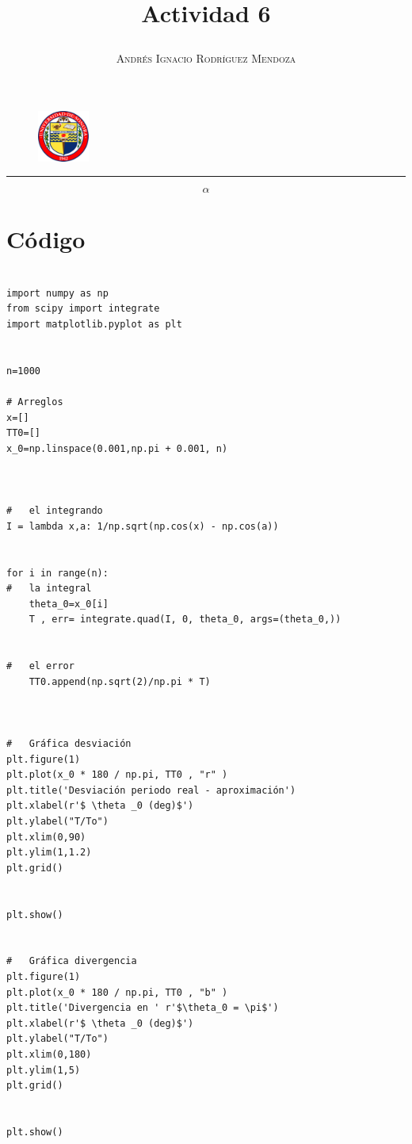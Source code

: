 \documentclass[11pt,spanish]{article}
\title{\vspace{-3cm}\begin{flushleft}\textbf{Actividad 6}\end{flushleft}}
\author{\hspace{-9.6cm}\textsc{Andrés Ignacio Rodríguez Mendoza}}
\date{}
\begin{document}
\begin{figure}
  \begin{center}
   \vspace{-5.4cm} \includegraphics[width=0.15\textwidth]{uni}
  \end{center}
\end{figure}

\maketitle  
\begin{center}
\rule{\textwidth}{1pt}
\end{center}

$$\alpha$$


\section*{Código}



\begin{lstlisting}

import numpy as np
from scipy import integrate
import matplotlib.pyplot as plt


n=1000

# Arreglos 
x=[]
TT0=[]
x_0=np.linspace(0.001,np.pi + 0.001, n)



#   el integrando
I = lambda x,a: 1/np.sqrt(np.cos(x) - np.cos(a))


for i in range(n):
#   la integral
    theta_0=x_0[i]
    T , err= integrate.quad(I, 0, theta_0, args=(theta_0,))
    
    
#   el error
    TT0.append(np.sqrt(2)/np.pi * T)
    
    
    
#   Gráfica desviación
plt.figure(1)
plt.plot(x_0 * 180 / np.pi, TT0 , "r" )
plt.title('Desviación periodo real - aproximación')
plt.xlabel(r'$ \theta _0 (deg)$')
plt.ylabel("T/To")
plt.xlim(0,90)
plt.ylim(1,1.2)
plt.grid()


plt.show()


#   Gráfica divergencia
plt.figure(1)
plt.plot(x_0 * 180 / np.pi, TT0 , "b" )
plt.title('Divergencia en ' r'$\theta_0 = \pi$')
plt.xlabel(r'$ \theta _0 (deg)$')
plt.ylabel("T/To")
plt.xlim(0,180)
plt.ylim(1,5)
plt.grid()


plt.show()

\end{lstlisting}
\end{document}

